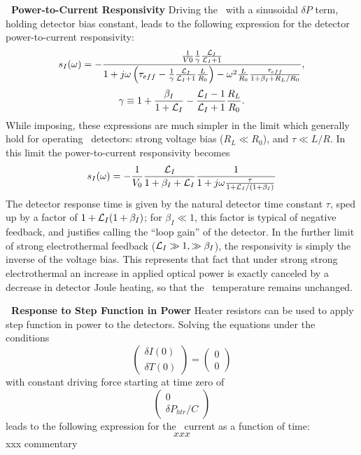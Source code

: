 \textbf{\TES\ Power-to-Current Responsivity}
Driving the \TES\ with a sinusoidal $\delta P$ term, holding detector bias constant, leads to the following expression for the detector power-to-current responsivity:
\begin{equation}
s_I(\omega) = 
- \frac{ \frac{1}{V0} \frac{1}{\gamma} \frac{\mathcal{L}_I}{\mathcal{L}_I + 1} }
       { 1 + j \omega \left( \tau_{eff} - \frac{1}{\gamma}\frac{\mathcal{L}_I}{\mathcal{L}_I + 1} \frac{L}{R_0}\right) - \omega^2 \frac{L}{R_0}\frac{\tau_{eff}}{1 + \beta_I + R_L / R_0}},
\end{equation}
\begin{equation}
\gamma \equiv 1 + \frac{\beta_I}{1+\mathcal{L}_I} - \frac{\mathcal{L}_I - 1}{\mathcal{L}_I + 1}\frac{R_L}{R_0}.
\end{equation}
While imposing, these expressions are much simpler in the limit which generally hold for operating \TES\ detectors: strong voltage bias ($R_L \ll R_0$), and $\tau \ll L/R$. 
In this limit the power-to-current responsivity becomes
\begin{equation}
s_I(\omega) = -\frac{1}{V_0} \frac{\mathcal{L}_I}{1+\beta_I + \mathcal{L}_I} \frac{1}{1 + j \omega \frac{\tau}{1 +\mathcal{L}_I/(1+\beta_I)}}
\end{equation}
The detector response time is given by the natural detector time constant $\tau$, sped up by a factor of $1 + \mathcal{L}_I(1+\beta_I)$; for $\beta_I \ll 1$, this factor is typical of negative feedback, and justifies calling \Loop the ``loop gain'' of the detector.
In the further limit of strong electrothermal feedback ($\mathcal{L}_I \gg 1, \gg \beta_I$), the \DC responsivity is simply the inverse of the voltage bias.
This represents that fact that under strong strong electrothermal an increase in applied optical power is exactly canceled by a decrease in detector Joule heating, so that the \TES\ temperature remains unchanged.

\textbf{\TES\ Response to Step Function in Power}
Heater resistors can be used to apply step function in power to the detectors.
Solving the equations under the conditions
\begin{equation}
\begin{pmatrix} \delta I(0) \\ \delta T(0) \end{pmatrix} = \begin{pmatrix} 0 \\ 0 \end{pmatrix}
\end{equation}
with constant driving force starting at time zero of
\begin{equation}
\begin{pmatrix} 0 \\ \delta P_{htr} / C \end{pmatrix}
\end{equation}
leads to the following expression for the \TES\ current as a function of time:
\begin{equation}
xxx
\end{equation}
xxx commentary

